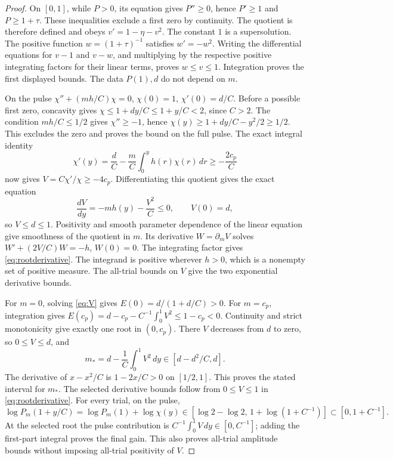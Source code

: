 \documentclass[11pt]{article}
\begin{document}
\begin{proof}
On $[0,1]$, while $P>0$, its equation gives $P''\geq0$,
hence $P'\geq1$ and $P\geq1+\tau$. These inequalities exclude
a first zero by continuity. The quotient is therefore defined and obeys
$v'=1-\eta-v^2$. The constant $1$ is a supersolution.
The positive function $w=(1+\tau)^{-1}$ satisfies $w'=-w^2$.
Writing the differential equations for $v-1$ and $v-w$, and multiplying
by the respective positive integrating factors for their linear terms,
proves $w\leq v\leq1$. Integration proves the first displayed bounds.
The data $P(1),d$ do not depend on $m$.

On the pulse $\chi''+(mh/C)\chi=0$, $\chi(0)=1$,
$\chi'(0)=d/C$. Before a possible first zero, concavity gives
$\chi\leq1+dy/C\leq1+y/C<2$, since $C>2$.
The condition $mh/C\leq1/2$ gives $\chi''\geq-1$, hence
$\chi(y)\geq1+dy/C-y^2/2\geq1/2$. This excludes the zero and
proves the bound on the full pulse. The exact integral identity
\[
 \chi'(y)=\frac dC-\frac mC\int_0^yh(r)\chi(r)\,dr
 \geq-\frac{2c_p}C
\]
now gives $V=C\chi'/\chi\geq-4c_p$. Differentiating this quotient
gives the exact equation
\begin{equation}\label{eq:V}
 \frac{dV}{dy}=-mh(y)-\frac{V^2}{C}\leq0,\qquad V(0)=d,
\end{equation}
so $V\leq d\leq1$. Positivity and smooth parameter dependence of the
linear equation give smoothness of the quotient in $m$. Its derivative
$W=\partial_mV$ solves $W'+(2V/C)W=-h$, $W(0)=0$.
The integrating factor gives \eqref{eq:rootderivative}. The integrand is
positive wherever $h>0$, which is a nonempty set of positive measure.
The all-trial bounds on $V$ give the two exponential derivative bounds.

For $m=0$, solving \eqref{eq:V} gives
$E(0)=d/(1+d/C)>0$. For $m=c_p$, integration gives
$E(c_p)=d-c_p-C^{-1}\int_0^1V^2\leq1-c_p<0$.
Continuity and strict monotonicity give exactly one root in $(0,c_p)$.
There $V$ decreases from $d$ to zero, so $0\leq V\leq d$, and
\[
 m_*=d-\frac1C\int_0^1V^2\,dy\in[d-d^2/C,d].
\]
The derivative of $x-x^2/C$ is $1-2x/C>0$ on $[1/2,1]$.
This proves the stated interval for $m_*$. The selected derivative
bounds follow from $0\leq V\leq1$ in \eqref{eq:rootderivative}.
For every trial, on the pulse,
\[
 \log P_m(1+y/C)=\log P_m(1)+\log\chi(y)
 \in[\log2-\log2,\,1+\log(1+C^{-1})]
 \subset[0,1+C^{-1}].
\]
At the selected root the pulse contribution is
$C^{-1}\int_0^1V\,dy\in[0,C^{-1}]$; adding the first-part
integral proves the final gain. This also proves all-trial amplitude
bounds without imposing all-trial positivity of $V$.
\end{proof}
\end{document}
